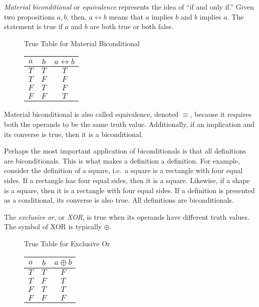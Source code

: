 \bigskip
\begin{definition}
    \emph{Material biconditional} or \emph{equivalence} represents the idea of ``if and only if.'' Given two propositions \(a,b\), then, \(a\leftrightarrow b\) means that \(a\) implies
    \(b\) and \(b\) implies \(a\). The statement is true if \(a\) and \(b\) are both true or both false. 
\end{definition}

\begin{figure}[H]
    \centering
    True Table for Material Biconditional
    
    \begin{tabular}{ccc}
        \(a\) & \(b\) & \(a\leftrightarrow b\) \\
        \hline
        \(T\) & \(T\) & \(T\) \\
        \(T\) & \(F\) & \(F\) \\
        \(F\) & \(T\) & \(F\) \\
        \(F\) & \(F\) & \(T\)
    \end{tabular}
\end{figure}

Material biconditional is also called equivalence, denoted \(\equiv\), because it requires both the operands to be the same truth value. Additionally, if an implication
and its converse is true, then it is a biconditional. 

Perhaps the most important application of biconditionals is that all definitions are biconditionals. This is what makes a definition a definition. For example, consider
the definition of a square, i.e.\ a square is a rectangle with four equal sides. If a rectangle has four equal sides, then it is a square. Likewise, if a shape is a 
square, then it is a rectangle with four equal sides. If a definition is presented as a conditional, its converse is also true. All definitions are biconditionals.

\bigskip
\begin{definition}
    The \emph{exclusive or}, or \emph{XOR}, is true when its operands have different truth values. The symbol of XOR is typically \(\oplus\).
\end{definition}

\begin{figure}[H]
    \centering
    True Table for Exclusive Or
    
    \begin{tabular}{ccc}
        \(a\) & \(b\) & \(a\oplus b\) \\
        \hline
        \(T\) & \(T\) & \(F\) \\
        \(T\) & \(F\) & \(T\) \\
        \(F\) & \(T\) & \(T\) \\
        \(F\) & \(F\) & \(F\)
    \end{tabular}
\end{figure}

